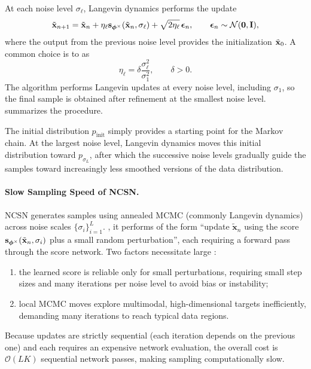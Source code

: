 At each noise level $\sigma_\ell$, Langevin dynamics performs the update
\[
\tilde{{\mathbf{x}}}_{n+1}
=
\tilde{{\mathbf{x}}}_n
+
\eta_\ell
{\mathbf{s}}_{\bm{\phi}^\times}(\tilde{{\mathbf{x}}}_n,\sigma_\ell)
+
\sqrt{2\eta_\ell}\,\bm{\epsilon}_n,
\qquad
\bm{\epsilon}_n\sim\mathcal{N}(\bm{0},{\mathbf{I}}),
\]
where the output from the previous noise level provides the initialization
$\tilde{{\mathbf{x}}}_0$.
A common choice is to  as
\[
\eta_\ell
=
\delta\frac{\sigma_\ell^2}{\sigma_1^2},
\qquad
\delta>0.
\]
The algorithm performs Langevin updates at every noise level, including
$\sigma_1$, so the final sample is obtained after refinement at the smallest
noise level.  summarizes the procedure.

The initial distribution $p_{\mathrm{init}}$ simply provides a starting point
for the Markov chain. At the largest noise level, Langevin dynamics moves this
initial distribution toward $p_{\sigma_L}$, after which the successive noise
levels gradually guide the samples toward increasingly less smoothed versions
of the data distribution.

\paragraph{Slow Sampling Speed of NCSN.}
NCSN generates samples using annealed MCMC (commonly Langevin dynamics) across noise scales $\{\sigma_i\}_{i=1}^L$.  
, it performs  of the form ``update $\tilde{\mathbf{x}}_n$ using the score ${\mathbf{s}}_{\bm{\phi}^\times}(\tilde{\mathbf{x}}_n,\sigma_i)$ plus a small random perturbation'', each requiring a forward pass through the score network. Two factors necessitate large :  
\begin{enumerate}
    \item[(i)]  the learned score is reliable only for small perturbations, requiring small step sizes and many iterations per noise level to avoid bias or instability;
    \item[(ii)]  local MCMC moves explore multimodal, high-dimensional targets inefficiently, demanding many iterations to reach typical data regions.
\end{enumerate}
Because updates are strictly sequential (each iteration depends on the previous one) and each requires an expensive network evaluation, the overall cost is $\mathcal{O}(L  K)$ sequential network passes, making sampling computationally slow.

